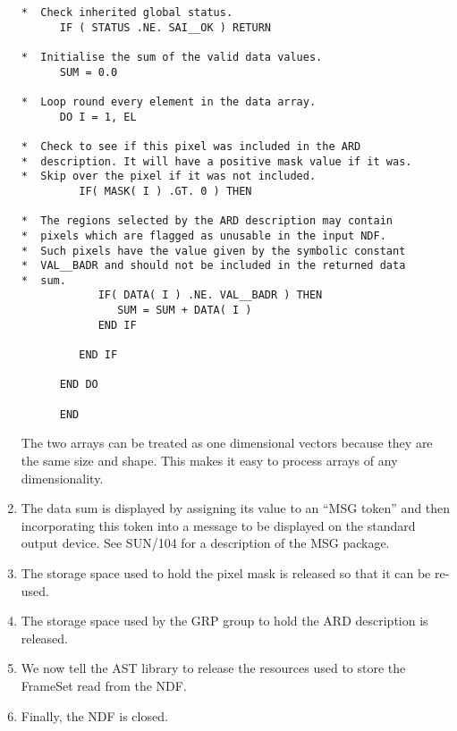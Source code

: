 \begin{enumerate}
\begin{verbatim}
*  Check inherited global status.                             
      IF ( STATUS .NE. SAI__OK ) RETURN                       
                                                              
*  Initialise the sum of the valid data values.               
      SUM = 0.0                                               
                                                              
*  Loop round every element in the data array.                
      DO I = 1, EL                                            
                                                              
*  Check to see if this pixel was included in the ARD         
*  description. It will have a positive mask value if it was. 
*  Skip over the pixel if it was not included.                
         IF( MASK( I ) .GT. 0 ) THEN                          
                                                              
*  The regions selected by the ARD description may contain    
*  pixels which are flagged as unusable in the input NDF.     
*  Such pixels have the value given by the symbolic constant  
*  VAL__BADR and should not be included in the returned data  
*  sum.                                                       
            IF( DATA( I ) .NE. VAL__BADR ) THEN               
               SUM = SUM + DATA( I )                          
            END IF                                            
                                                              
         END IF                                               
                                                              
      END DO                                                  
                                                              
      END                                                     
\end{verbatim}
\normalsize

The two arrays can be treated as one dimensional vectors because they are the
same size and shape. This makes it easy to process arrays of any dimensionality.


\item The data sum is displayed by assigning its value to an ``MSG token'' and 
then incorporating this token into a message to be displayed on the standard 
output device. See SUN/104 for a description of the MSG package.

\item The storage space used to hold the pixel mask is released so that it can 
be re-used.

\item The storage space used by the GRP group to hold the ARD description is 
released.

\item We now tell the AST library to release the resources used to store
the FrameSet read from the NDF.

\item Finally, the NDF is closed.
\end{enumerate}

